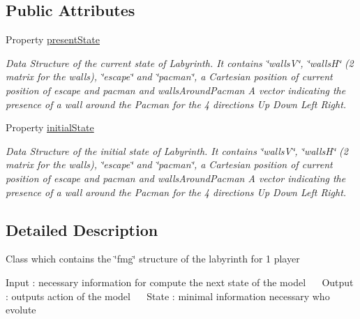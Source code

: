 \subsection*{Public Attributes}
\begin{DoxyCompactItemize}
\item 
Property \hyperlink{class_model_laby_a9624cc7c421a50fa5086b0ebd0cd5fe3}{present\+State}
\begin{DoxyCompactList}\small\item\em Data Structure of the current state of Labyrinth. It contains \char`\"{}walls\+V\char`\"{}, \char`\"{}walls\+H\char`\"{} (2 matrix for the walls), \char`\"{}escape\char`\"{} and \char`\"{}pacman\char`\"{}, a Cartesian position of current position of escape and pacman and \textquotesingle{}walls\+Around\+Pacman\textquotesingle{} A vector indicating the presence of a wall around the Pacman for the 4 directions Up Down Left Right. \end{DoxyCompactList}\item 
Property \hyperlink{class_model_laby_acd9263acfa96c9138afdf497e55acc24}{initial\+State}
\begin{DoxyCompactList}\small\item\em Data Structure of the initial state of Labyrinth. It contains \char`\"{}walls\+V\char`\"{}, \char`\"{}walls\+H\char`\"{} (2 matrix for the walls), \char`\"{}escape\char`\"{} and \char`\"{}pacman\char`\"{}, a Cartesian position of current position of escape and pacman and \textquotesingle{}walls\+Around\+Pacman\textquotesingle{} A vector indicating the presence of a wall around the Pacman for the 4 directions Up Down Left Right. \end{DoxyCompactList}\end{DoxyCompactItemize}


\subsection{Detailed Description}
Class which contains the \char`\"{}fmg\char`\"{} structure of the labyrinth for 1 player 

Input \+: necessary information for compute the next state of the model~\newline
~\newline
 Output \+: output\textquotesingle{}s action of the model~\newline
 ~\newline
 State \+: minimal information necessary who evolute 


